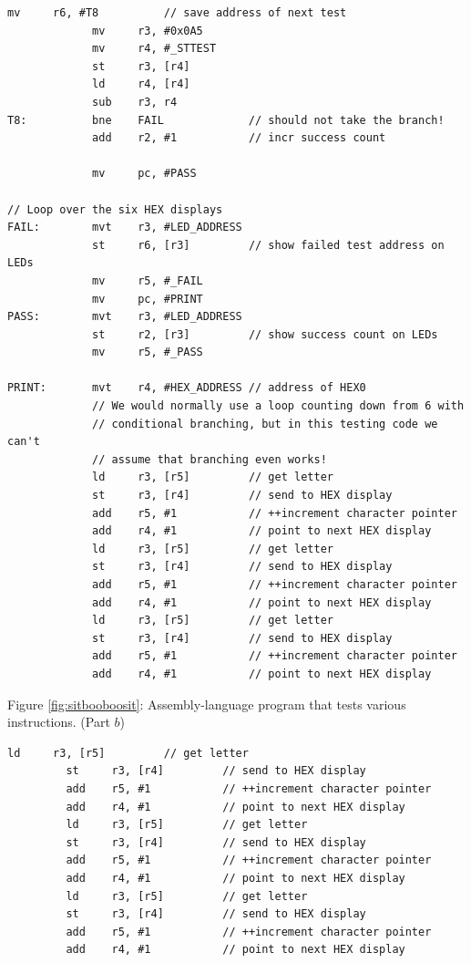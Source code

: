 \documentclass[epsfig,10pt,fullpage]{article} \addtolength{\textwidth}{1.5in}
\begin{document}
\begin{enumerate}
\begin{center}
\begin{minipage}[t]{14 cm}
\begin{lstlisting}[name=proc]
             mv     r6, #T8          // save address of next test
             mv     r3, #0x0A5
             mv     r4, #_STTEST
             st     r3, [r4]        
             ld     r4, [r4]
             sub    r3, r4
T8:          bne    FAIL             // should not take the branch!
             add    r2, #1           // incr success count

             mv     pc, #PASS

// Loop over the six HEX displays
FAIL:        mvt    r3, #LED_ADDRESS
             st     r6, [r3]         // show failed test address on LEDs
             mv     r5, #_FAIL
             mv     pc, #PRINT
PASS:        mvt    r3, #LED_ADDRESS
             st     r2, [r3]         // show success count on LEDs
             mv     r5, #_PASS

PRINT:       mvt    r4, #HEX_ADDRESS // address of HEX0 
             // We would normally use a loop counting down from 6 with 
             // conditional branching, but in this testing code we can't
             // assume that branching even works!
             ld     r3, [r5]         // get letter 
             st     r3, [r4]         // send to HEX display
             add    r5, #1           // ++increment character pointer 
             add    r4, #1           // point to next HEX display
             ld     r3, [r5]         // get letter 
             st     r3, [r4]         // send to HEX display
             add    r5, #1           // ++increment character pointer 
             add    r4, #1           // point to next HEX display
             ld     r3, [r5]         // get letter 
             st     r3, [r4]         // send to HEX display
             add    r5, #1           // ++increment character pointer 
             add    r4, #1           // point to next HEX display
\end{lstlisting}
\end{minipage}
\end{center}

\begin{center}
Figure \ref{fig:sitbooboosit}: Assembly-language program that tests various instructions. (Part $b$)
\end{center}

\begin{center}
\begin{minipage}[t]{14 cm}
\begin{lstlisting}[name=proc]
         ld     r3, [r5]         // get letter 
         st     r3, [r4]         // send to HEX display
         add    r5, #1           // ++increment character pointer 
         add    r4, #1           // point to next HEX display
         ld     r3, [r5]         // get letter 
         st     r3, [r4]         // send to HEX display
         add    r5, #1           // ++increment character pointer 
         add    r4, #1           // point to next HEX display
         ld     r3, [r5]         // get letter 
         st     r3, [r4]         // send to HEX display
         add    r5, #1           // ++increment character pointer 
         add    r4, #1           // point to next HEX display
            

\end{lstlisting}
\end{minipage}
\end{center}
\end{enumerate}
\end{document}
